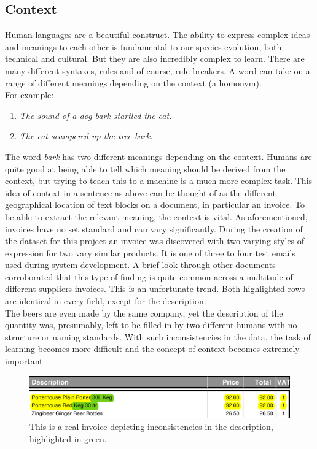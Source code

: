 \subsection{Context}
\label{sec:context}
Human languages are a beautiful construct. The ability to express complex ideas and meanings to each other is fundamental
to our species evolution, both technical and cultural. But they are also incredibly complex to learn. There are many different syntaxes, rules and
of course, rule breakers. A word can take on a range of different meanings depending on the context (a homonym). \\
For example:
\begin{enumerate}
	\item \emph{The sound of a dog bark startled the cat.}
	\item \emph{The cat scampered up the tree bark.}
\end{enumerate}
The word \emph{bark} has two different meanings depending on the context. Humans are quite good at being able to tell which meaning
should be derived from the context, but trying to teach this to a machine is a much more complex task.
\bigbreak
This idea of context in a sentence as above can be thought of as the different geographical location of text blocks on a document,
in particular an invoice. To be able to extract the relevant meaning, the context is vital. As aforementioned, invoices
have no set standard and can vary significantly. During the creation of the dataset for this project an invoice was discovered
with two varying styles of expression for two vary similar products. It is one of three to four test emails used during system
development. A brief look through other documents corroborated that this type of finding is quite common across a multitude of
different suppliers invoices. This is an unfortunate trend.
\bigbreak
Both highlighted rows are identical in every field, except for the description.\\
The beers are even made by the same company, yet the description of the quantity was, presumably, left to be filled in by two different humans with
no structure or naming standards. With such inconsistencies in the data, the task of learning becomes more difficult and the concept of context
becomes extremely important.
\begin{figure}[H]
	\centering
	\includegraphics[width=1\linewidth]{figures/invo_complexity.png}
	\caption[Invoice depicting inconsistencies]{This is a real invoice depicting inconsistencies in the description, highlighted in green.}
	\label{fig:context}
\end{figure}
